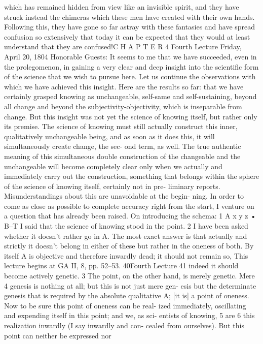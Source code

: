 which has remained hidden from view like an invisible spirit, and they have
struck instead the chimeras which these men have created with their own
hands. Following this, they have gone so far astray with these fantasies and
have spread confusion so extensively that today it can be expected that they
would at least understand that they are confused!C H A P T E R
4
Fourth Lecture
Friday, April 20, 1804
Honorable Guests:
It seems to me that we have succeeded, even in the prolegomenon, in gaining
a very clear and deep insight into the scientific form of the science that we
wish to pursue here. Let us continue the observations with which we have
achieved this insight.
Here are the results so far: that we have certainly grasped knowing as
unchangeable, self-same and self-sustaining, beyond all change and beyond the
subjectivity-objectivity, which is inseparable from change. But this insight was
not yet the science of knowing itself, but rather only its premise. The science
of knowing must still actually construct this inner, qualitatively unchangeable
being, and as soon as it does this, it will simultaneously create change, the sec-
ond term, as well.
The true authentic meaning of this simultaneous double construction of
the changeable and the unchangeable will become completely clear only when
we actually and immediately carry out the construction, something that
belongs within the sphere of the science of knowing itself, certainly not in pre-
liminary reports. Misunderstandings about this are unavoidable at the begin-
ning. In order to come as close as possible to complete accuracy right from the
start, I venture on a question that has already been raised.
On introducing the schema: 1
A
x y z • B–T
I said that the science of knowing stood in the point. 2 I have been asked
whether it doesn’t rather go in A. The most exact answer is that actually and
strictly it doesn’t belong in either of these but rather in the oneness of both.
By itself A is objective and therefore inwardly dead; it should not remain so,
This lecture begins at GA II, 8, pp. 52–53.
40Fourth Lecture
41
indeed it should become actively genetic. 3 The point, on the other hand, is
merely genetic. Mere 4 genesis is nothing at all; but this is not just mere gen-
esis but the determinate genesis that is required by the absolute qualitative
A; [it is] a point of oneness. Now to be sure this point of oneness can be real-
ized immediately, oscillating and expending itself in this point; and we, as sci-
entists of knowing, 5 are 6 this realization inwardly (I say inwardly and con-
cealed from ourselves). But this point can neither be expressed nor
